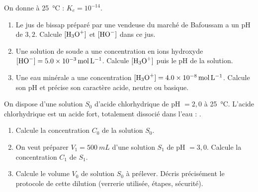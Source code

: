 \documentclass[11pt]{article}
\newcounter{popsec}
\newcounter{popsub}
\newcommand{\courssub}[1]{%
  \stepcounter{popsub}%
  \par\vspace{9pt}\noindent{\popxbold\fontsize{11.5}{13}\selectfont\color{popink}{\color{poporange}\thepopsec.\thepopsub}\hspace{6pt}#1}\par\nopagebreak\vspace{4pt}
}
\begin{document}
\courssub{Je m'entraîne}

\begin{exercice}
On donne à \SI{25}{\celsius} : $K_e = 10^{-14}$.
\begin{enumerate}
\item Le jus de bissap préparé par une vendeuse du marché de Bafoussam a un pH de $3{,}2$. Calcule $[\ce{H3O+}]$ et $[\ce{HO-}]$ dans ce jus.
\item Une solution de soude a une concentration en ions hydroxyde $[\ce{HO-}] = \SI{5,0e-3}{mol.L^{-1}}$. Calcule $[\ce{H3O+}]$ puis le pH de la solution.
\item Une eau minérale a une concentration $[\ce{H3O+}] = \SI{4,0e-8}{mol.L^{-1}}$. Calcule son pH et précise son caractère acide, neutre ou basique.
\end{enumerate}
\end{exercice}

\begin{exercice}
On dispose d'une solution $S_0$ d'acide chlorhydrique de pH $= 2{,}0$ à \SI{25}{\celsius}. L'acide chlorhydrique est un acide fort, totalement dissocié dans l'eau : .
\begin{enumerate}
\item Calcule la concentration $C_0$ de la solution $S_0$.
\item On veut préparer $V_1 = \SI{500}{mL}$ d'une solution $S_1$ de pH $= 3{,}0$. Calcule la concentration $C_1$ de $S_1$.
\item Calcule le volume $V_0$ de solution $S_0$ à prélever. Décris précisément le protocole de cette dilution (verrerie utilisée, étapes, sécurité).
\end{enumerate}
\end{exercice}
\end{document}

